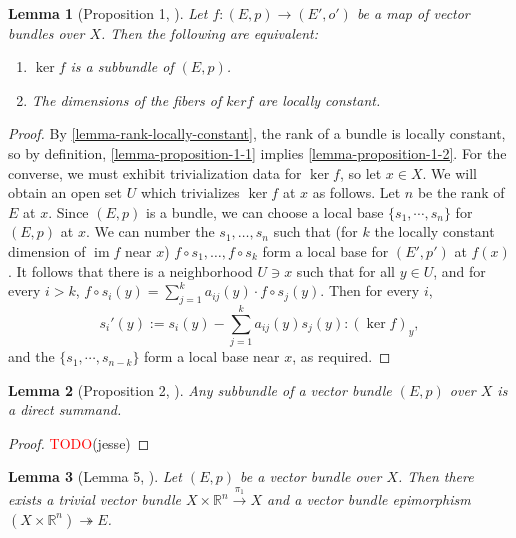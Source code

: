 \documentclass[11pt]{article}
\newcommand{\R}{\mathbb{R}}
\newcommand{\remph}[1]{\textcolor{red}{#1}}
\newcommand{\TODO}{\remph{TODO}}
\newcommand{\im}{\operatorname{im}}
\renewcommand{\ker}{\operatorname{ker}}
\theoremstyle{plain}
\newtheorem{lemma}{Lemma}[section]
\theoremstyle{definition}
\begin{document}
\begin{lemma}[Proposition 1, \cite{swan1962vector}]\label{lemma-proposition-1}
  Let \(f : (E,p) \to (E',o')\) be a map of vector bundles over \(X\). Then the following are equivalent:
  \begin{enumerate}[label={(\alph*)}]
  \item \label{lemma-proposition-1-1} \(\ker f\) is a subbundle of \((E,p)\). 
  \item \label{lemma-proposition-1-2} The dimensions of the fibers of \(ker f\) are locally constant.
  \end{enumerate}
\end{lemma}
\begin{proof}
  By \ref{lemma-rank-locally-constant}, the rank of a bundle is locally constant, so by definition, \ref{lemma-proposition-1-1} implies \ref{lemma-proposition-1-2}. For the converse, we must exhibit trivialization data for \(\ker f\), so let \(x \in X\). We will obtain an open set \(U\) which trivializes \(\ker f\) at \(x\) as follows. Let \(n\) be the rank of \(E\) at \(x\). Since \((E,p)\) is a bundle, we can choose a local base \(\{s_1, \cdots, s_n\}\) for \((E,p)\) at \(x\). We can number the \(s_1, \dots, s_n\) such that (for \(k\) the locally constant dimension of \(\im f\) near \(x\)) \(f \circ s_1, \dots, f \circ s_k\) form a local base for \((E',p')\) at \(f(x)\). It follows that there is a neighborhood \(U \ni x\) such that for all \(y \in U\), and for every \(i > k\), \(f \circ s_i(y) = \sum_{j = 1}^k a_{ij}(y) \cdot f \circ s_j(y).\) Then for every \(i\),
  \[s_i'(y) := s_i(y) - \sum_{j = 1}^k a_{ij}(y)s_j(y) : (\ker f)_y,\]
  and the $\{s_1, \cdots, s_{n - k}\}$ form a local base near \(x\), as required.
\end{proof}
\begin{lemma}[Proposition 2, \cite{swan1962vector}] \label{lemma-proposition-2}
  Any subbundle of a vector bundle \((E,p)\) over \(X\) is a direct summand.
\end{lemma}

\begin{proof}
  \TODO(jesse)
\end{proof}


\begin{lemma}[Lemma 5, \cite{swan1962vector}]\label{lemma-lemma-5}
  Let \((E,p)\) be a vector bundle over \(X\). Then there exists a trivial vector bundle \(X \times \R^n \overset{\pi_1}{\to} X\) and a vector bundle epimorphism \((X \times \R^n) \twoheadrightarrow E\).
\end{lemma}
\end{document}
